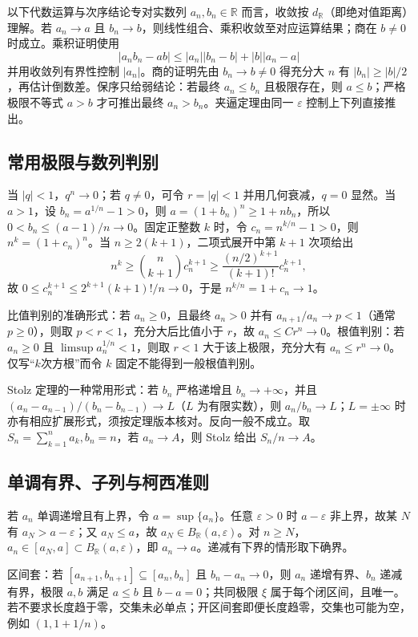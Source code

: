 \documentclass[11pt,a4paper,UTF8]{ctexart}
\theoremstyle{definition}\newtheorem{definition}[theorem]{定义}
\theoremstyle{remark}\newtheorem{remark}[theorem]{说明}
\begin{document}
以下代数运算与次序结论专对实数列 $a_n,b_n\in\mathbb R$ 而言，收敛按 $d_{\mathbb R}$（即绝对值距离）理解。若 $a_n\to a$ 且 $b_n\to b$，则线性组合、乘积收敛至对应运算结果；商在 $b\ne0$ 时成立。乘积证明使用
\[
|a_nb_n-ab|\le |a_n||b_n-b|+|b||a_n-a|
\]
并用收敛列有界性控制 $|a_n|$。商的证明先由 $b_n\to b\ne0$ 得充分大 $n$ 有 $|b_n|\ge |b|/2$，再估计倒数差。保序只给弱结论：若最终 $a_n\le b_n$ 且极限存在，则 $a\le b$；严格极限不等式 $a>b$ 才可推出最终 $a_n>b_n$。夹逼定理由同一 $\varepsilon$ 控制上下列直接推出。

\subsection{常用极限与数列判别}
当 $|q|<1$，$q^n\to0$；若 $q\ne0$，可令 $r=|q|<1$ 并用几何衰减，$q=0$ 显然。当 $a>1$，设 $b_n=a^{1/n}-1>0$，则 $a=(1+b_n)^n\ge1+nb_n$，所以 $0<b_n\le(a-1)/n\to0$。固定正整数 $k$ 时，令 $c_n=n^{k/n}-1>0$，则 $n^k=(1+c_n)^n$。当 $n\ge2(k+1)$，二项式展开中第 $k+1$ 次项给出
\[
n^k\ge\binom n{k+1}c_n^{k+1}\ge\frac{(n/2)^{k+1}}{(k+1)!}c_n^{k+1},
\]
故 $0\le c_n^{k+1}\le 2^{k+1}(k+1)!/n\to0$，于是 $n^{k/n}=1+c_n\to1$。

比值判别的准确形式：若 $a_n\ge0$，且最终 $a_n>0$ 并有 $a_{n+1}/a_n\to p<1$（通常 $p\ge0$），则取 $p<r<1$，充分大后比值小于 $r$，故 $a_n\le C r^n\to0$。根值判别：若 $a_n\ge0$ 且 $\limsup a_n^{1/n}<1$，则取 $r<1$ 大于该上极限，充分大有 $a_n\le r^n\to0$。仅写“$k$次方根”而令 $k$ 固定不能得到一般根值判别。

Stolz 定理的一种常用形式：若 $b_n$ 严格递增且 $b_n\to+\infty$，并且 $(a_n-a_{n-1})/(b_n-b_{n-1})\to L$（$L$ 为有限实数），则 $a_n/b_n\to L$；$L=\pm\infty$ 时亦有相应扩展形式，须按定理版本核对。反向一般不成立。取 $S_n=\sum_{k=1}^n a_k,b_n=n$，若 $a_n\to A$，则 Stolz 给出 $S_n/n\to A$。

\subsection{单调有界、子列与柯西准则}
若 $a_n$ 单调递增且有上界，令 $a=\sup\{a_n\}$。任意 $\varepsilon>0$ 时 $a-\varepsilon$ 非上界，故某 $N$ 有 $a_N>a-\varepsilon$；又 $a_N\le a$，故 $a_N\in B_{\mathbb R}(a,\varepsilon)$。对 $n\ge N$，$a_n\in[a_N,a]\subset B_{\mathbb R}(a,\varepsilon)$，即 $a_n\to a$。递减有下界的情形取下确界。

区间套：若 $[a_{n+1},b_{n+1}]\subseteq[a_n,b_n]$ 且 $b_n-a_n\to0$，则 $a_n$ 递增有界、$b_n$ 递减有界，极限 $a,b$ 满足 $a\le b$ 且 $b-a=0$；共同极限 $\xi$ 属于每个闭区间，且唯一。若不要求长度趋于零，交集未必单点；开区间套即便长度趋零，交集也可能为空，例如 $(1,1+1/n)$。
\end{document}
